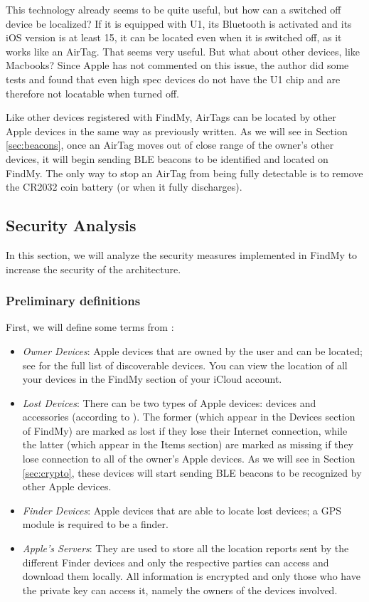\documentclass[english]{article}
\begin{document}
This technology already seems to be quite useful, but how can a switched off device be localized? If it is equipped with U1, its Bluetooth is activated and its iOS version is at least 15, it can be located even when it is switched off, as it works like an AirTag. That seems very useful. But what about other devices, like Macbooks? Since Apple has not commented on this issue, the author did some tests and found that even high spec devices do not have the U1 chip and are therefore not locatable when turned off.

Like other devices registered with FindMy, AirTags can be located by other Apple devices in the same way as previously written. As we will see in Section \ref{sec:beacons}, once an AirTag moves out of close range of the owner's other devices, it will begin sending BLE beacons to be identified and located on FindMy. The only way to stop an AirTag from being fully detectable is to remove the CR2032 coin battery (or when it fully discharges).

\subsection{Security Analysis}
In this section, we will analyze the security measures implemented in FindMy to increase the security of the architecture.
\subsubsection{Preliminary definitions}
First, we will define some terms from \cite{whocanfind}:
\begin{itemize}
  \item \textit{Owner Devices}: Apple devices that are owned by the user and can be located; see \cite{Apple} for the full list of discoverable devices. You can view the location of all your devices in the FindMy section of your iCloud account.
  \item \textit{Lost Devices}: There can be two types of Apple devices: devices and accessories (according to \cite{whocanfind}). The former (which appear in the Devices section of FindMy) are marked as lost if they lose their Internet connection, while the latter (which appear in the Items section) are marked as missing if they lose connection to all of the owner’s Apple devices. As we will see in Section \ref{sec:crypto}, these devices will start sending BLE beacons to be recognized by other Apple devices.
  \item \textit{Finder Devices}: Apple devices that are able to locate lost devices; a GPS module is required to be a finder.
  \item \textit{Apple’s Servers}: They are used to store all the location reports sent by the different Finder devices and only the respective parties can access and download them locally. All information is encrypted and only those who have the private key can access it, namely the owners of the devices involved.
\end{itemize}
\end{document}
